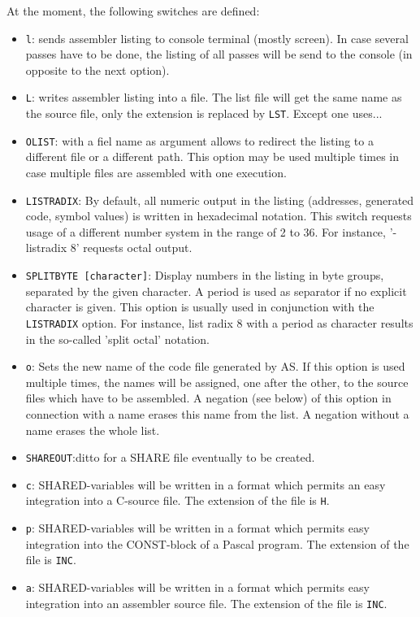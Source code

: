 \documentclass[12pt,twoside]{report}
\makeatletter
\newcommand{\tty}[1]{{\tt #1}}
\newcommand{\ttindex}[1]{\index{#1@{\tt #1}}}
\makeatother
\begin{document}
At the moment, the following switches are defined:
\ttindex{SHARED}
\begin{itemize}
\item{\tty{l}: sends assembler listing to console terminal (mostly screen).
      In case several passes have to be done, the listing of all
      passes will be send to the console (in opposite to the next
      option).}
\item{\tty{L}: writes assembler listing into a file. The list file will get
      the same name as the source file, only the extension is
      replaced by \tty{LST}.  Except one uses... }
\item{\tty{OLIST}: with a fiel name as argument allows to redirect the
      listing to a different file or a different path.  This option may
      be used multiple times in case multiple files are assembled with
      one execution.}
\item{\tty{LISTRADIX}: By default, all numeric output in the listing
      (addresses, generated code, symbol values) is written in hexadecimal
      notation.  This switch requests usage of a different number system in the
      range of 2 to 36.  For instance, '-listradix 8' requests octal output.}
\item{\tty{SPLITBYTE [character]}: Display numbers in the listing in byte groups,
      separated by the given character.  A period is used as separator if
      no explicit character is given.  This option is usually used in conjunction
      with the \tty{LISTRADIX} option.  For instance, list radix 8 with a
      period as character results in the so-called 'split octal' notation.}
\item{\tty{o}: Sets the new name of the code file generated by AS.  If this
      option is used multiple times, the names will be assigned, one
      after the other, to the source files which have to be
      assembled.  A negation (see below) of this option in
      connection with a name erases this name from the list.  A
      negation without a name erases the whole list.}
\item{\tty{SHAREOUT}:ditto for a SHARE file eventually to be created.}
\item{\tty{c}: SHARED-variables will be written in a format which permits
      an easy integration into a C-source file.  The extension of
      the file is \tty{H}.}
\item{\tty{p}: SHARED-variables will be written in a format which permits
      easy integration into the CONST-block of a Pascal program.
      The extension of the file is \tty{INC}.}
\item{\tty{a}: SHARED-variables will be written in a format which permits
      easy integration into an assembler source file. The
      extension of the file is \tty{INC}.}
\end{itemize}
\end{document}
